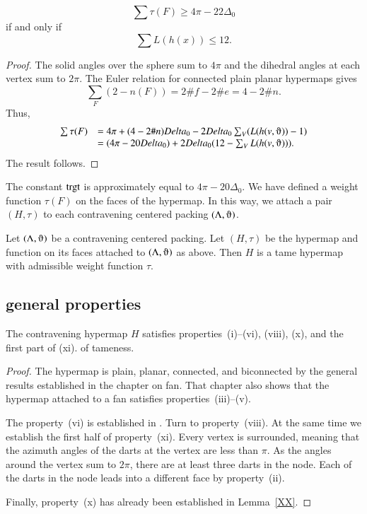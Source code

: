 \begin{lemma}
$$
\sum \tau (F) \ge 4\pi - 22\Delta_0
$$
if and only if
$$
\sum L(h(x)) \le 12.
$$
\end{lemma}

\begin{proof}
The solid angles over the sphere sum to $4\pi$ and the dihedral angles at each vertex sum to $2\pi$.  The Euler relation for connected plain planar hypermaps gives
$$
\sum_F (2- n(F)) = 2\#f - 2\#e = 4 - 2\#n.
$$
Thus,
$$
\begin{array}{lll}
\sum \tau (F) 
&= 4\pi + (4-2\#n) \Delta_0 - 2\Delta_0 \sum_V (L(h(v,\orgn))-1) \\
&= (4\pi - 20\Delta_0) + 2\Delta_0 (12 - \sum_V L(h(v,\orgn))).
\end{array}
$$
The result follows.
\end{proof}

The constant ${\operatorname{trgt}}$ is approximately equal to $4\pi - 20\Delta_0$.
We have defined a weight function $\tau(F)$ on the faces of the hypermap.  In this way, we attach a pair $(H,\tau)$ to each contravening centered packing $(\Lambda,\orgn)$.


\begin{theorem} \label{theorem:contravene}
Let $(\Lambda,\orgn)$ be a contravening centered packing.  Let $(H,\tau)$ be
the hypermap and function on its faces attached to $(\Lambda,\orgn)$ as above.
Then $H$ is a tame hypermap with admissible weight function $\tau$.
\end{theorem}




\subsection{general properties}
    \label{sec:startame}



\begin{lemma} The contravening hypermap $H$ satisfies properties~(i)--(vi), (viii),  (x), and the first part of (xi).
of tameness.
\end{lemma}

\begin{proof}
The hypermap is plain, planar, connected, and biconnected by the general results established in the chapter on fan.  That chapter also shows that the hypermap attached to a fan satisfies properties~(iii)--(v).  

The property~(vi) is established in \cite[Lemma~3.7]{sp1}.
Turn to property~(viii). At the same time we establish the first half of property~(xi).  Every vertex is surrounded, meaning that the azimuth angles of the darts at the vertex are less than $\pi$.  As the angles around the vertex sum to $2\pi$, there are at least three darts in the node. Each of the darts in the node leads into a different face by property~(ii).

Finally, property~(x) has already been established in Lemma~\ref{XX}.
\end{proof}

